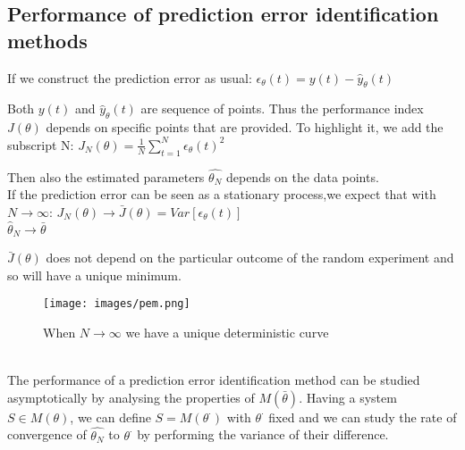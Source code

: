 \documentclass[10pt,a4paper]{article}
\begin{document}
\subsection{Performance of prediction error identification methods}
If we construct the prediction error as usual:
\center
	$\epsilon_\theta(t)=y(t)-\hat{y}_\theta(t)$
\\ \raggedright
Both $y(t)$ and $\hat{y}_\theta(t)$ are sequence of points. Thus the performance index $J(\theta)$ depends on specific points that are provided. To highlight it, we add the subscript N:
\center
	$J_N(\theta) = \frac{1}{N}\sum_{t=1}^N\epsilon_\theta(t)^2$
\\ \raggedright \vspace{0.5em}
Then also the estimated parameters $\hat{\theta_N}$ depends on the data points. \\If the prediction error can be seen as a stationary process,we expect that with $N \rightarrow \infty$:
\center $J_N(\theta) \rightarrow \bar{J}(\theta)=Var[\epsilon_\theta(t)]$\\  $\hat{\theta}_N \rightarrow \bar{\theta}$
\\ \raggedright \vspace{0.3em}
$\bar{J}(\theta)$ does not depend on the particular outcome of the random experiment and so will have a unique minimum.
 \begin{figure}[h!]
 \hfill \texttt{[image: images/pem.png]}\hspace*{\fill}
  \label{fig:pem}
  \caption{When $N \rightarrow \infty$ we have a unique deterministic curve}
\end{figure} \\
The performance of a prediction error identification method can be studied asymptotically by analysing the properties of $M(\bar{\theta})$. Having a system $S \in M(\theta)$, we can define $S=M(\theta^\cdot)$ with $\theta^\cdot$ fixed and we can study the rate of convergence of $\hat{\theta_N}$ to $\theta^\cdot$ by performing the variance of their difference.
\end{document}

